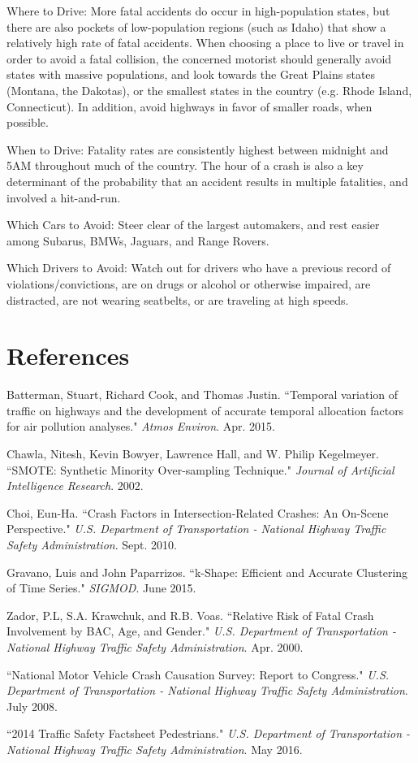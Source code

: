\documentclass[11pt, oneside,titlepage]{article}   	%
\begin{document}
Where to Drive: More fatal accidents do occur in high-population states, but there are also pockets of low-population regions (such as Idaho) that show a relatively high rate of fatal accidents. When choosing a place to live or travel in order to avoid a fatal collision, the concerned motorist should generally avoid states with massive populations, and look towards the Great Plains states (Montana, the Dakotas), or the smallest states in the country (e.g. Rhode Island, Connecticut). In addition, avoid highways in favor of smaller roads, when possible. 

When to Drive: Fatality rates are consistently highest between midnight and 5AM throughout much of the country. The hour of a crash is also a key determinant of the probability that an accident results in multiple fatalities, and involved a hit-and-run.

Which Cars to Avoid: Steer clear of the largest automakers, and rest easier among Subarus, BMWs, Jaguars, and Range Rovers.

Which Drivers to Avoid: Watch out for drivers who have a previous record of violations/convictions, are on drugs or alcohol or otherwise impaired, are distracted, are not wearing seatbelts, or are traveling at high speeds.


\section*{References}
\begin{hangparas}{1.27cm}{1}
Batterman, Stuart, Richard Cook, and Thomas Justin. ``Temporal variation of traffic on highways and the development of accurate temporal allocation factors for air pollution analyses." \textit{Atmos Environ}. Apr. 2015.

Chawla, Nitesh, Kevin Bowyer, Lawrence Hall, and W. Philip Kegelmeyer. ``SMOTE: Synthetic Minority Over-sampling Technique." \textit{Journal of Artificial Intelligence Research}. 2002.

Choi, Eun-Ha. ``Crash Factors in Intersection-Related Crashes: An On-Scene Perspective." \textit{U.S. Department of Transportation - National Highway Traffic Safety Administration}. Sept. 2010.

Gravano, Luis and John Paparrizos. ``k-Shape: Efficient and Accurate Clustering of Time Series." \textit{SIGMOD}. June 2015.

Zador, P.L, S.A. Krawchuk, and R.B. Voas. ``Relative Risk of Fatal Crash Involvement by BAC, Age, and Gender." \textit{U.S. Department of Transportation - National Highway Traffic Safety Administration}. Apr. 2000.

``National Motor Vehicle Crash Causation Survey: Report to Congress." \textit{U.S. Department of Transportation - National Highway Traffic Safety Administration}. July 2008.

``2014 Traffic Safety Factsheet Pedestrians." \textit{U.S. Department of Transportation - National Highway Traffic Safety Administration}. May 2016.

\end{hangparas}
\end{document}
